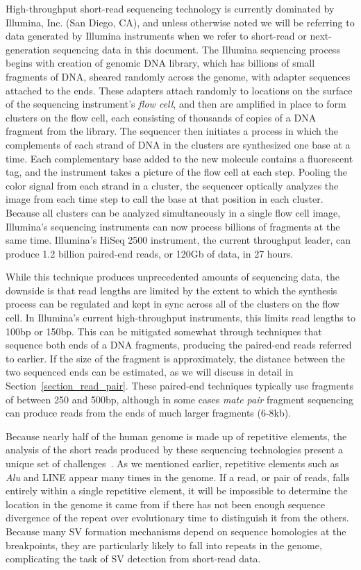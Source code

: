 High-throughput short-read sequencing technology is currently dominated by Illumina, Inc. (San Diego, CA), and unless otherwise noted we will be referring to data generated by Illumina instruments when we refer to short-read or next-generation sequencing data in this document. The Illumina sequencing process begins with creation of genomic DNA library, which has billions of small fragments of DNA, sheared randomly across the genome, with adapter sequences attached to the ends. These adapters attach randomly to locations on the surface of the sequencing instrument's \emph{flow cell}, and then are amplified in place to form clusters on the flow cell, each consisting of thousands of copies of a DNA fragment from the library. The sequencer then initiates a process in which the complements of each strand of DNA in the clusters are synthesized one base at a time. Each complementary base added to the new molecule contains a fluorescent tag, and the instrument takes a picture of the flow cell at each step. Pooling the color signal from each strand in a cluster, the sequencer optically analyzes the image from each time step to call the base at that position in each cluster. Because all clusters can be analyzed simultaneously in a single flow cell image, Illumina's sequencing instruments can now process billions of fragments at the same time. Illumina's HiSeq 2500 instrument, the current throughput leader, can produce 1.2 billion paired-end reads, or 120Gb of data, in 27 hours. 

While this technique produces unprecedented amounts of sequencing data, the downside is that read lengths are limited by the extent to which the synthesis process can be regulated and kept in sync across all of the clusters on the flow cell. In Illumina's current high-throughput instruments, this limits read lengths to 100bp or 150bp. This can be mitigated somewhat through techniques that sequence both ends of a DNA fragments, producing the paired-end reads referred to earlier. If the size of the fragment is approximately, the distance between the two sequenced ends can be estimated, as we will discuss in detail in Section~\ref{section_read_pair}. These paired-end techniques typically use fragments of between 250 and 500bp, although in some cases \emph{mate pair} fragment sequencing can produce reads from the ends of much larger fragments (6-8kb).

Because nearly half of the human genome is made up of repetitive elements, the analysis of the short reads produced by these sequencing technologies present a unique set of challenges~\cite{Treangen:2011p1810}. As we mentioned earlier, repetitive elements such as \emph{Alu} and LINE appear many times in the genome. If a read, or pair of reads, falls entirely within a single repetitive element, it will be impossible to determine the location in the genome it came from if there has not been enough sequence divergence of the repeat over evolutionary time to distinguish it from the others. Because many SV formation mechanisms depend on sequence homologies at the breakpoints, they are particularly likely to fall into repeats in the genome, complicating the task of SV detection from short-read data.

